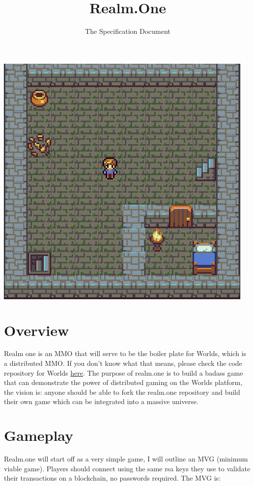 \documentclass{article}
\begin{document}
\title{Realm.One}
\author{The Specification Document}

\maketitle
\begin{center}
\includegraphics[scale=0.3]{ss.png}
\end{center}
\newpage

\section{Overview}
Realm one is an MMO that will serve to be the boiler plate for Worlds, which is a distributed MMO. If you don't know what that means, please check the code repository for Worlds \href{worldsmmo.com}{here}. The purpose of realm.one is to build a badass game that can demonstrate the power of distributed gaming on the Worlds platform, the vision is: anyone should be able to fork the realm.one repository and build their own game which can be integrated into a massive universe.

\section{Gameplay}
Realm.one will start off as a very simple game, I will outline an MVG (minimum viable game). Players should connect using the same rsa keys they use to validate their transactions on a blockchain, no passwords required. The MVG is:
\end{document}

